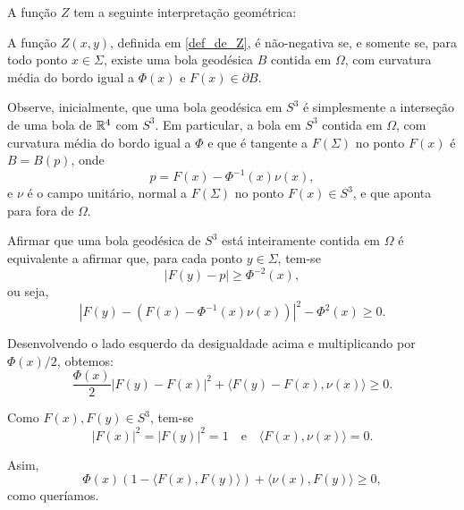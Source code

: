 A função $Z$ tem a seguinte interpretação geométrica:

\begin{proposicao}
	A função $ Z(x,y) $, definida em \ref{def_de_Z}, é não-negativa se, e somente se, para todo ponto $ x \in \Sigma $, existe uma bola geodésica $B$ contida em $\Omega$, com curvatura média do bordo igual a $ \Phi(x) $ e $ F(x) \in \partial B $.
\end{proposicao}

\begin{demonstracao}
	Observe, inicialmente, que uma bola geodésica em $S^3$ é simplesmente a interseção de uma bola de $\mathbb{R}^4$ com $S^3$. Em particular, a bola em $S^3$ contida em $\Omega$, com curvatura média do bordo igual a $\Phi$ e que é tangente a $ F(\Sigma) $ no ponto $F(x)$ é $B=B(p)$, onde 
	\begin{equation*}
		p = F(x) - \Phi^{-1}(x) \nu(x),
	\end{equation*}
	e $\nu$ é o campo unitário, normal a $F(\Sigma)$ no ponto $F(x) \in S^3$, e que aponta para fora de $\Omega$.
	
	Afirmar que uma bola geodésica de $S^3$ está inteiramente contida em $\Omega$ é equivalente a afirmar que, para cada ponto $y \in \Sigma$, tem-se
	\begin{equation*}
		| F(y) - p | \geq \Phi^{-2}(x),
	\end{equation*}
	ou seja,
	\begin{equation*}
		| F(y) - ( F(x) - \Phi^{-1}(x) \nu(x) ) |^2 - \Phi^2(x) \geq 0.
	\end{equation*}
	
	Desenvolvendo o lado esquerdo da desigualdade acima e multiplicando por $ \Phi(x)/2 $, obtemos:
	\begin{equation*}
		\frac{\Phi(x)}{2} | F(y) - F(x) |^2 + \langle F(y) - F(x), \nu(x) \rangle \geq 0.
	\end{equation*}
	
	Como $F(x), F(y) \in S^3$, tem-se
	\begin{equation*}
		|F(x)|^2 = |F(y)|^2 = 1 \quad \text{e} \quad \langle F(x), \nu(x) \rangle = 0.
	\end{equation*}
	
	Asim,
	\begin{equation*}
		\Phi(x) (1 - \langle F(x), F(y) \rangle) + \langle \nu(x), F(y) \rangle \geq 0,
	\end{equation*} 
	como queríamos.
\end{demonstracao}



